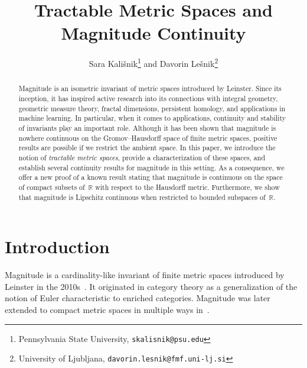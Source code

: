 \documentclass[11pt]{article}
\title{Tractable Metric Spaces and Magnitude Continuity} %
\author{
Sara Kali\v{s}nik\thanks{
 Pennsylvania State University,
\texttt{skalisnik@psu.edu}}\phantom{x} and 
Davorin Le\v{s}nik\thanks{
University of Ljubljana,
\texttt{davorin.lesnik@fmf.uni-lj.si}}
}
\date{}
\theoremstyle{plain}
\theoremstyle{definition}
\newcommand{\transpose}{{\mathsf{T}}}
\newcommand{\mg}[1][]{\mathsf{mag}_{#1}}
\begin{document}
\maketitle

\begin{abstract}
Magnitude is an isometric invariant of metric spaces introduced by Leinster. Since its inception, it has inspired active research into its connections with integral geometry, geometric measure theory, fractal dimensions, persistent homology, and applications in machine learning. In particular, when it comes to applications, continuity and stability of invariants play an important role. Although it has been shown that magnitude is nowhere continuous on the Gromov–Hausdorff space of finite metric spaces, positive results are possible if we restrict the ambient space. In this paper, we introduce the notion of \emph{tractable metric spaces}, provide a characterization of these spaces, and establish several continuity results for magnitude in this setting. As a consequence, we offer a new proof of a known result stating that magnitude is continuous on the space of compact subsets of~\(\mathbb{R}\) with respect to the Hausdorff metric. Furthermore, we show that magnitude is Lipschitz continuous when restricted to bounded subspaces of~\(\mathbb{R}\).
\end{abstract}


\section{Introduction}
Magnitude is a cardinality-like invariant of finite metric spaces introduced by Leinster in the 2010s~\cite{leinster2010}. It originated in category theory as a generalization of the notion of Euler characteristic to enriched categories. Magnitude was later extended to compact metric spaces in multiple ways in~\cite{leinster2010,LW13,Willerton2014,W09,meckes2013}.

\end{document}
